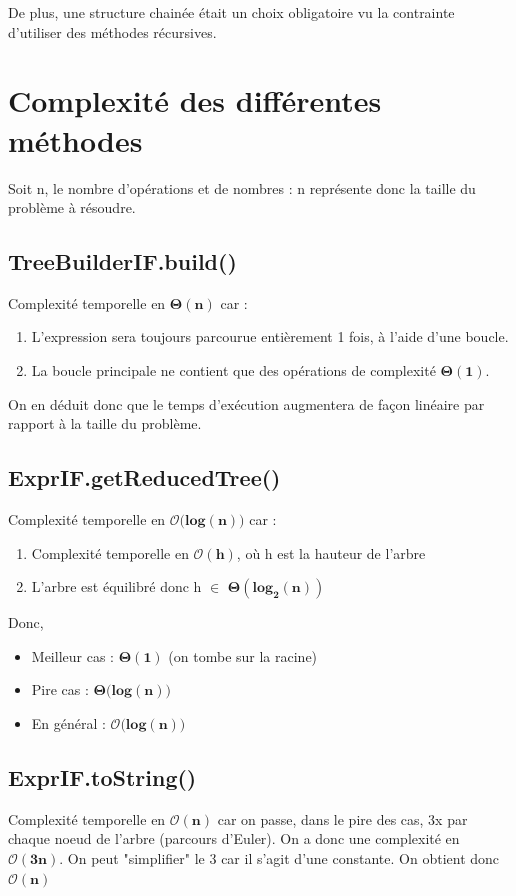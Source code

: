 \documentclass[12pt, a4paper, table]{article}
\begin{document}
De plus, une structure chainée était un choix obligatoire vu la contrainte d'utiliser des méthodes récursives.
\vspace{-6pt}
\section{Complexité des différentes méthodes}
\noindent Soit n, le nombre d'opérations et de nombres : n représente donc la taille du problème à résoudre.
\vspace{-6pt}
\subsection{TreeBuilderIF.build()}
\noindent Complexité temporelle en $\mathbf{\Theta (n)}$ car :

\begin{enumerate}
	\item L'expression sera toujours parcourue entièrement 1 fois, à l'aide d'une boucle.
	\item La boucle principale ne contient que des opérations de complexité $\mathbf{\Theta (1)}$.
\end{enumerate}

\noindent On en déduit donc que le temps d'exécution augmentera de façon linéaire par rapport à la taille du problème.

\subsection{ExprIF.getReducedTree()}
\noindent Complexité temporelle en $\mathbf{\mathcal{O}(}\mathbf{log (n))}$ car :
\begin{enumerate}
	\item Complexité temporelle en $\mathbf{\mathcal{O}(h)}$, où h est la hauteur de l’arbre
	\item L'arbre est équilibré donc h $\in$ $\mathbf{\Theta(\mathbf{log}_{2} (n))}$
\end{enumerate}
Donc, 
\begin{itemize}
	\item Meilleur cas : $\mathbf{\Theta (1)}$ (on tombe sur la racine)
	\item Pire cas : $\mathbf{\Theta(}\mathbf{log (n))}$
	\item En général : $\mathbf{\mathcal{O}(}\mathbf{log (n))}$
\end{itemize}



\subsection{ExprIF.toString()}
\noindent Complexité temporelle en $\mathbf{\mathcal{O}(n)}$ car on passe, dans le pire des cas, 3x par chaque noeud de l'arbre (parcours d'Euler). On a donc une complexité en  $\mathbf{\mathcal{O}(3n)}$. On peut "simplifier" le 3 car il s'agit d'une constante. On obtient donc $\mathbf{\mathcal{O}(n)}$  
\end{document}
